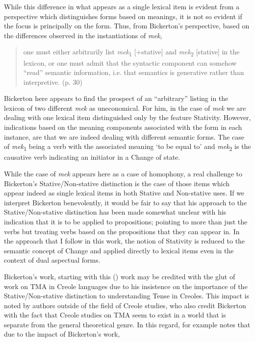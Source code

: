 While this difference in what appears as a single lexical item is
evident from a perspective which distinguishes forms based on
meanings, it is not so evident if the focus is principally on the
form.  Thus, from Bickerton’s perspective, based on the differences
observed in the instantiations of \textit{mek,}

\begin{quote}
one must either arbitrarily list \textit{mek}\textsubscript{1} [+stative] and \textit{mek}\textsubscript{2} [\textminus stative] in the
lexicon, or one must admit that the syntactic component can somehow
``read'' semantic information, i.e. that semantics is generative rather
than interpretive. (p. 30)
\end{quote}

Bickerton here appears to find the prospect of an ``arbitrary'' listing
in the lexicon of two different \textit{mek} as uneconomical.  For
him, in the case of \textit{mek} we are dealing with one lexical item
distinguished only by the feature Stativity.  However, indications
based on the meaning components associated with the form in each
instance, are that we are indeed dealing with different semantic
forms.  The case of \textit{mek}\textsubscript{1} being a verb with
the associated meaning `to be equal to' and
\textit{mek}\textsubscript{2} is the causative verb indicating an
initiator in a Change of state.

While the case of \textit{mek} appears here as a case of homophony, a
real challenge to Bickerton’s Stative\slash Non-stative distinction is the
case of those items which appear indeed as single lexical items in
both Stative and Non-stative uses.  If we interpret Bickerton
benevolently, it would be fair to say that his approach to the
Stative\slash Non-stative distinction has been made somewhat unclear with
his indication that it is to be applied to propositions; pointing to
more than just the verbs but treating verbs based on the propositions
that they can appear in.  In the approach that I follow in this work,
the notion of Stativity is reduced to the semantic concept of Change
and applied directly to lexical items even in the context of dual
aspectual forms.

Bickerton’s work, starting with this (\citeyear{Bickerton1975}) work may be credited with
the glut of work on TMA in Creole languages due to his insistence on
the importance of the Stative\slash Non-stative distinction to understanding
Tense in Creoles.  This impact is noted by authors outside of the
field of Creole studies, who also credit Bickerton with the fact that
Creole studies on TMA seem to exist in a world that is separate from
the general theoretical genre.  In this regard, \citet{Dahl1993} for
example notes that due to the impact of Bickerton’s work,


